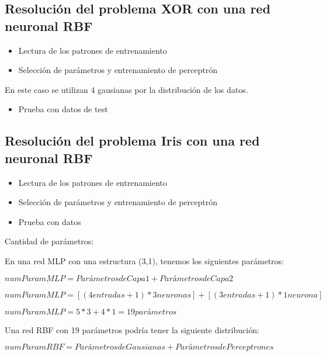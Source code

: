 \documentclass[]{book}
\providecommand{\tightlist}{%
  \setlength{\itemsep}{0pt}\setlength{\parskip}{0pt}}
\begin{document}
\hypertarget{resolucion-del-problema-xor-con-una-red-neuronal-rbf}{%
\subsection{Resolución del problema XOR con una red neuronal RBF}\label{resolucion-del-problema-xor-con-una-red-neuronal-rbf}}

\begin{itemize}
\item
  Lectura de los patrones de entrenamiento
\item
  Selección de parámetros y entrenamiento de perceptrón
\end{itemize}

En este caso se utilizan 4 gausianas por la distribución de los datos.

\begin{itemize}
\tightlist
\item
  Prueba con datos de test
\end{itemize}

\hypertarget{resolucion-del-problema-iris-con-una-red-neuronal-rbf}{%
\subsection{Resolución del problema Iris con una red neuronal RBF}\label{resolucion-del-problema-iris-con-una-red-neuronal-rbf}}

\begin{itemize}
\item
  Lectura de los patrones de entrenamiento
\item
  Selección de parámetros y entrenamiento de perceptrón
\item
  Prueba con datos
\end{itemize}

Cantidad de parámetros:

En una red MLP con una estructura (3,1), tenemos los siguientes parámetros:

\(numParamMLP = Parámetros de Capa 1 + Parámetros de Capa 2\)

\(numParamMLP = [(4 entradas + 1) * 3 neuronas] + [(3 entradas + 1) * 1 neurona]\)

\(numParamMLP = 5 * 3 + 4 * 1 = 19 parámetros\)

Una red RBF con 19 parámetros podría tener la siguiente distribución:

\(numParamRBF = Parámetros de Gausianas + Parámetros de Perceptrones\)
\end{document}
